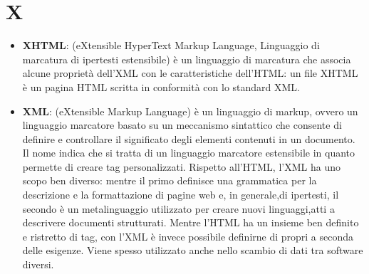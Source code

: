 \section{X}
\begin{itemize} 
	\item
	\textbf{XHTML}: (eXtensible HyperText Markup Language, Linguaggio di marcatura di ipertesti estensibile) è un linguaggio di marcatura che associa alcune proprietà dell'XML con le caratteristiche dell'HTML: un file XHTML è un pagina HTML scritta in conformità con lo standard XML.
	\item
	\textbf{XML}: (eXtensible Markup Language) è un linguaggio di markup, ovvero un linguaggio marcatore basato su un meccanismo sintattico che consente di definire e controllare il significato degli elementi contenuti in un documento. Il nome indica che si tratta di un linguaggio marcatore estensibile in quanto permette di creare tag personalizzati. Rispetto all’HTML, l’XML ha uno scopo ben diverso: mentre il primo definisce una grammatica per la descrizione e la formattazione di pagine web e, in generale,di ipertesti, il secondo è un metalinguaggio utilizzato per creare nuovi linguaggi,atti a descrivere documenti strutturati. Mentre l’HTML ha un insieme ben definito e ristretto di tag, con l’XML è invece possibile definirne di propri a seconda delle esigenze. Viene spesso utilizzato anche nello scambio di dati tra software diversi.
\end{itemize}